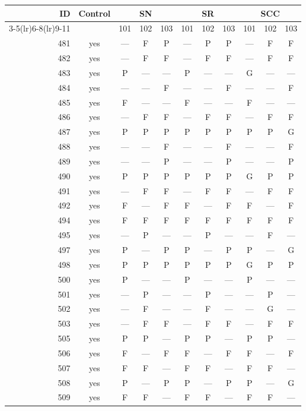 \begin{table}[p]\centering\small
\begin{tabular*}{\textwidth}{@{\extracolsep{\fill}}rc*{9}{c}@{}}\toprule
ID & Control & \multicolumn{3}{c}{SN} & \multicolumn{3}{c}{SR} & \multicolumn{3}{c}{SCC}\\
\cmidrule(lr){3-5}\cmidrule(lr){6-8}\cmidrule(lr){9-11}
 & & 101 & 102 & 103 & 101 & 102 & 103 & 101 & 102 & 103\\\midrule
481 & yes & — & F & P & — & P & P & — & F & F\\
482 & yes & — & F & F & — & F & F & — & F & F\\
483 & yes & P & — & — & P & — & — & G & — & —\\
484 & yes & — & — & F & — & — & F & — & — & F\\
485 & yes & F & — & — & F & — & — & F & — & —\\
486 & yes & — & F & F & — & F & F & — & F & F\\
487 & yes & P & P & P & P & P & P & P & P & G\\
488 & yes & — & — & F & — & — & F & — & — & F\\
489 & yes & — & — & P & — & — & P & — & — & P\\
490 & yes & P & P & P & P & P & P & G & P & P\\
491 & yes & — & F & F & — & F & F & — & F & F\\
492 & yes & F & — & F & F & — & F & F & — & F\\
494 & yes & F & F & F & F & F & F & F & F & F\\
495 & yes & — & P & — & — & P & — & — & F & —\\
497 & yes & P & — & P & P & — & P & P & — & G\\
498 & yes & P & P & P & P & P & P & G & P & P\\
500 & yes & P & — & — & P & — & — & P & — & —\\
501 & yes & — & P & — & — & P & — & — & P & —\\
502 & yes & — & F & — & — & F & — & — & G & —\\
503 & yes & — & F & F & — & F & F & — & F & F\\
505 & yes & P & P & — & P & P & — & P & P & —\\
506 & yes & F & — & F & F & — & F & F & — & F\\
507 & yes & F & F & — & F & F & — & F & F & —\\
508 & yes & P & — & P & P & — & P & P & — & G\\
509 & yes & F & F & — & F & F & — & F & F & —\\

\end{tabular*}
\end{table}
